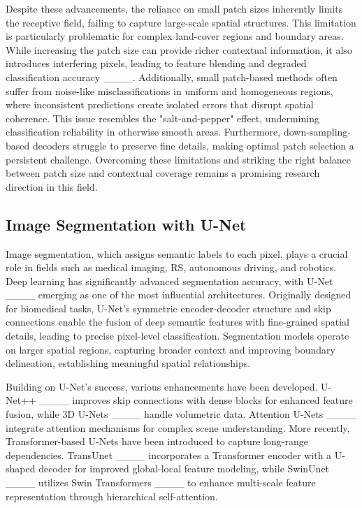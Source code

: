 Despite these advancements, the reliance on small patch sizes inherently limits the receptive field, failing to capture large-scale spatial structures. This limitation is particularly problematic for complex land-cover regions and boundary areas. While increasing the patch size can provide richer contextual information, it also introduces interfering pixels, leading to feature blending and degraded classification accuracy ____. Additionally, small patch-based methods often suffer from noise-like misclassifications in uniform and homogeneous regions, where inconsistent predictions create isolated errors that disrupt spatial coherence. This issue resembles the "salt-and-pepper" effect, undermining classification reliability in otherwise smooth areas. Furthermore, down-sampling-based decoders struggle to preserve fine details, making optimal patch selection a persistent challenge. Overcoming these limitations and striking the right balance between patch size and contextual coverage remains a promising research direction in this field.


\subsection{Image Segmentation with U-Net}
Image segmentation, which assigns semantic labels to each pixel, plays a crucial role in fields such as medical imaging, RS, autonomous driving, and robotics. Deep learning has significantly advanced segmentation accuracy, with U-Net ____ emerging as one of the most influential architectures. Originally designed for biomedical tasks, U-Net’s symmetric encoder-decoder structure and skip connections enable the fusion of deep semantic features with fine-grained spatial details, leading to precise pixel-level classification. Segmentation models operate on larger spatial regions, capturing broader context and improving boundary delineation, establishing meaningful spatial relationships.

Building on U-Net’s success, various enhancements have been developed. U-Net++ ____ improves skip connections with dense blocks for enhanced feature fusion, while 3D U-Nets ____ handle volumetric data. Attention U-Nets ____ integrate attention mechanisms for complex scene understanding. More recently, Transformer-based U-Nets have been introduced to capture long-range dependencies. TransUnet ____ incorporates a Transformer encoder with a U-shaped decoder for improved global-local feature modeling, while SwinUnet ____ utilizes Swin Transformers ____ to enhance multi-scale feature representation through hierarchical self-attention.

